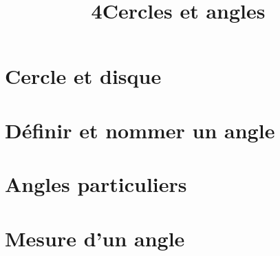 \documentclass[12pt,a4paper]{article}
\date{}
\title{\textcircled{{\normalsize{4}}}Cercles et angles}
\begin{document}
	
	\maketitle



\section{Cercle et disque }



\section{Définir et nommer un angle}



\section{Angles particuliers}




\section{Mesure d'un angle}


\end{document}
